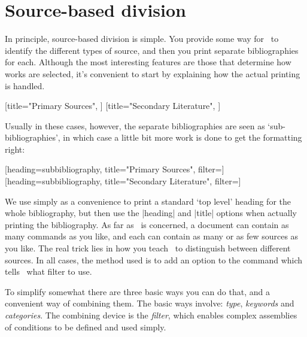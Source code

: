 \section{Source-based division}

In principle, source-based division is simple. You provide some way for
\biblatex\ to identify the different types of source, and then you print
separate bibliographies for each. Although the most interesting features
are those that determine how works are selected, it's convenient to start
by explaining how the actual printing is handled.

\begin{pseudoverb}
[title="Primary Sources",
                       ]
[title="Secondary Literature",
                       ]
\end{pseudoverb}
Usually in these cases, however, the separate bibliographies are seen
as `sub-bibliographies', in which case a little bit more work is
done to get the formatting right:

\begin{pseudoverb}
 [heading=subbibliography,
                      title="Primary Sources",
                      filter=]
 [heading=subbibliography,
                      title="Secondary Literature",
                      filter=]
\end{pseudoverb}
We use  simply as a convenience to print a
standard `top level' heading for the whole bibliography, but then use
the |heading| and |title| options when actually printing the
bibliography. As far as \biblatex\ is concerned, a document can contain
as many  commands as you
like, and each can contain as many or as few sources as you like.  The
real trick lies in how you teach \biblatex\ to distinguish between
different sources. In all cases, the method used is to add an option
to the  command which tells
\biblatex\ what filter to use.

To simplify somewhat there are three basic ways you can do that, and a
convenient way of combining them. The basic ways involve:
\emph{type}, \emph{keywords} and \emph{categories}. The
combining device is the \emph{filter}, which enables complex
assemblies of conditions to be defined and used simply.

